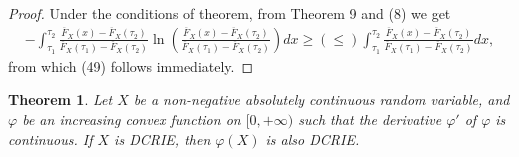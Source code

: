 \documentclass[11pt]{article}
\newtheorem{theorem}{Theorem}
\begin{document}
\begin{proof} Under the conditions of theorem, from Theorem 9 and (8) we get
	\begin{align*}
		\textstyle - \int_{\tau_1}^{\tau_2} \frac{\overline{F}_X(x) - \overline{F}_X(\tau_2)}{\overline{F}_X(\tau_1) - \overline{F}_X(\tau_2)} \ln \left( \frac{\overline{F}_X(x) - \overline{F}_X(\tau_2)}{\overline{F}_X(\tau_1) - \overline{F}_X(\tau_2)} \right) dx 
		\geq (\leq)
		\int_{\tau_1}^{\tau_2} \frac{\overline{F}_X(x) - \overline{F}_X(\tau_2)}{\overline{F}_X(\tau_1) - \overline{F}_X(\tau_2)} dx,
	\end{align*}
	from which (49) follows immediately. 
\end{proof}

 
\begin{theorem}
	Let $X$ be a non-negative absolutely continuous random variable, and $\varphi$ be an increasing convex function on $[0,+\infty)$ such that the derivative $\varphi'$ of $\varphi$ is continuous. If $X$ is DCRIE, then $\varphi(X)$ is also DCRIE.
\end{theorem}
\end{document}
